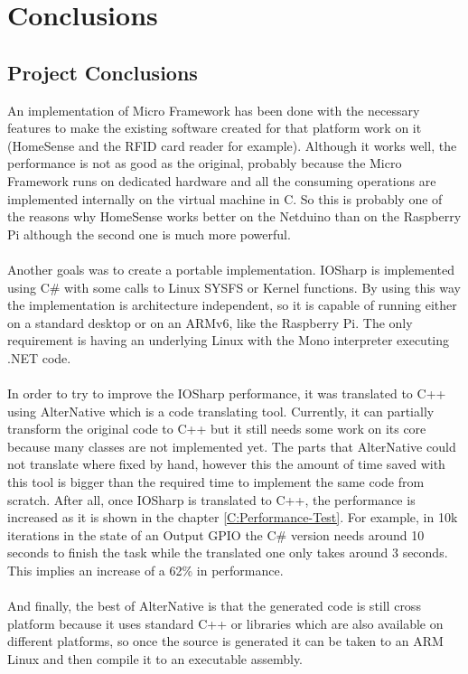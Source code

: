 \chapter{Conclusions}\label{C:Conclusions}
\section{Project Conclusions}\label{S:Project-Conclusions}
An implementation of Micro Framework has been done with the necessary features to make the existing software created for that platform work on it (HomeSense and the RFID card reader for example). Although it works well, the performance is not as good as the original, probably because the Micro Framework runs on dedicated hardware and all the consuming operations are implemented internally on the virtual machine in C. So this is probably one of the reasons why HomeSense works better on the Netduino than on the Raspberry Pi although the second one is much more powerful.
\\
\\
Another goals was to create a portable implementation. IOSharp is implemented using C\# with some calls to Linux SYSFS or Kernel functions. By using this way the implementation is architecture independent, so it is capable of running either on a standard desktop or on an ARMv6, like the Raspberry Pi. The only requirement is having an underlying Linux with the Mono interpreter executing .NET code.
\\
\\
In order to try to improve the IOSharp performance, it was translated to C++ using AlterNative which is a code translating tool. Currently, it can partially transform the original code to C++ but it still needs some work on its core because many classes are not implemented yet. The parts that AlterNative could not translate where fixed by hand, however this the amount of time saved with this tool is bigger than the required time to implement the same code from scratch. After all, once IOSharp is translated to C++, the performance is increased as it is shown in the chapter \ref{C:Performance-Test}. For example, in 10k iterations in the state of an Output GPIO the C\# version needs around 10 seconds to finish the task while the translated one only takes around 3 seconds. This implies an increase of a 62\% in performance.
\\
\\
And finally, the best of AlterNative is that the generated code is still cross platform because it uses standard C++ or libraries which are also available on different platforms, so once the source is generated it can be taken to an ARM Linux and then compile it to an executable assembly.

